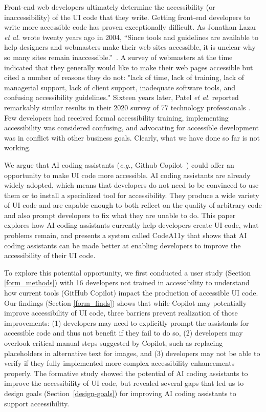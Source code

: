 Front-end web developers ultimately determine the accessibility (or inaccessibility) of the UI code that they write. Getting front-end developers to write more accessible code has proven exceptionally difficult. As Jonathan Lazar {\em et al.} wrote twenty years ago in 2004, ``Since tools and guidelines are available to help designers and webmasters make their web sites accessible, it is unclear why so many sites remain inaccessible.''~\cite{lazar2004improving}. A survey of webmasters at the time indicated that they generally would like to make their web pages accessible but cited a number of reasons they do not: "lack of time, lack of training, lack of managerial support, lack of client
support, inadequate software tools, and confusing accessibility guidelines." Sixteen years later, Patel {\em et al.} reported remarkably similar results in their 2020 survey of 77 technology professionals \cite{stillinaccessible}. Few developers had received formal accessibility training, implementing accessibility was considered confusing, and advocating for accessible development was in conflict with other business goals. Clearly, what we have done so far is not working.

We argue that AI coding assistants ({\em e.g.}, Github Copilot~\cite{GitHubCopilot}) could offer an opportunity to make UI code more accessible. AI coding assistants are already widely adopted, which means that developers do not need to be convinced to use them or to install a specialized tool for accessibility. They produce a wide variety of UI code and are capable enough to both reflect on the quality of arbitrary code and also prompt developers to fix what they are unable to do. This paper explores how AI coding assistants currently help developers create UI code, what problems remain, and presents a system called CodeA11y that shows that AI coding assistants can be made better at enabling developers to improve the accessibility of their UI code.

To explore this potential opportunity, we first conducted a user study (Section \ref{form_methods}) with 16 developers not trained in accessibility to understand how current tools (GitHub Copilot) impact the production of accessible UI code. Our findings (Section \ref{form_finds}) shows that while Copilot may potentially improve accessibility of UI code, three barriers prevent realization of those improvements: (1) developers may need to explicitly prompt the assistants for accessible code and thus not benefit if they fail to do so, (2) developers may overlook critical manual steps suggested by Copilot, such as replacing placeholders in alternative text for images, and (3) developers may not be able to verify if they fully implemented more complex accessibility enhancements properly. The formative study showed the potential of AI coding assistants to improve the accessibility of UI code, but revealed several gaps that led us to design goals (Section~\ref{design-goals}) for improving AI coding assistants to support accessibility.

